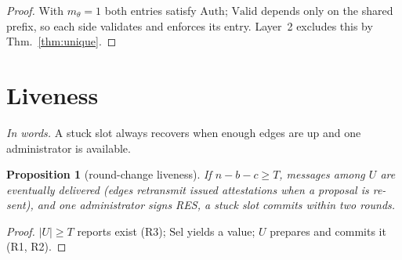\documentclass[conference]{IEEEtran}
\newtheorem{proposition}{Proposition}
\newcommand{\Val}{\mathrm{Valid}}
\newcommand{\Sel}{\mathrm{Sel}}
\newcommand{\words}[1]{\par\noindent\textit{In words.} #1\par\smallskip}
\begin{document}
\begin{proof}
With $m_\theta=1$ both entries satisfy $\mathrm{Auth}$; $\Val$ depends only on the shared prefix, so each side validates and enforces its entry. Layer~2 excludes this by Thm.~\ref{thm:unique}.
\end{proof}

\section{Liveness}
\words{A stuck slot always recovers when enough edges are up and one administrator is available.}
\begin{proposition}[round-change liveness]\label{prop:live}
If $n-b-c\ge T$, messages among $U$ are eventually delivered (edges retransmit issued attestations when a proposal is re-sent), and one administrator signs RES, a stuck slot commits within two rounds.
\end{proposition}
\begin{proof}
$|U|\ge T$ reports exist (R3); $\Sel$ yields a value; $U$ prepares and commits it (R1, R2).
\end{proof}
\end{document}
